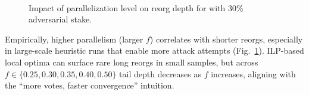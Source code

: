 \begin{figure}[htbp!]
\\
\caption{Impact of parallelization level on reorg depth for \ProjBase{} with 30\% adversarial stake.}
\label{fig:parallelization}
\end{figure}
Empirically, higher parallelism (larger $f$) correlates with shorter reorgs, especially in large-scale heuristic runs that enable more attack attempts (Fig.~\ref{fig:parallelization}). ILP-based local optima can surface rare long reorgs in small samples, but across $f\in\{0.25,0.30,0.35,0.40,0.50\}$ tail depth decreases as $f$ increases, aligning with the “more votes, faster convergence” intuition.


